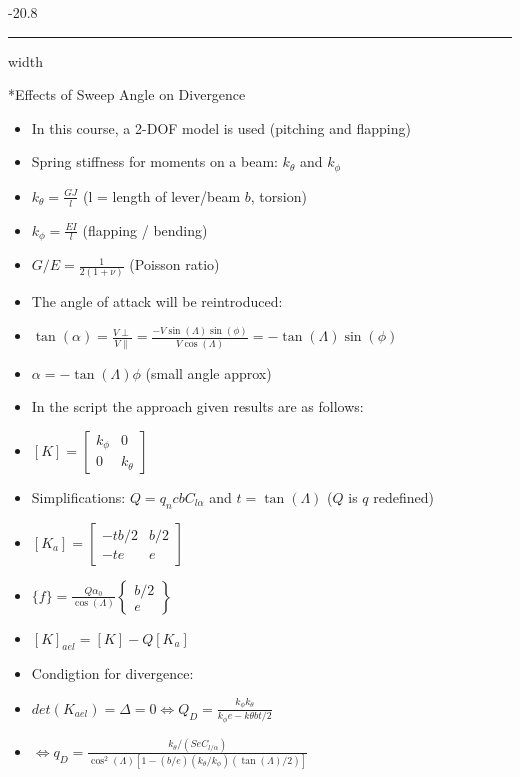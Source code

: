 \documentclass[8pt, landscape, fleqn]{scrartcl}
\makeatletter
\renewcommand{\subsubsection}{\@startsection{subsubsection}{1}{0mm}%
{-2\baselineskip}{0.8\baselineskip}%
{\hrule depth 0.2pt width\columnwidth\vspace*{1.2em}\normalsize\bfseries\rmfamily}}
\makeatother
\begin{document}
\begin{multicols*}{3}
\subsubsection*{Effects of Sweep Angle on Divergence}

\begin{itemize}
    \item In this course, a 2-DOF model is used (pitching and flapping)
    \item Spring stiffness for moments on a beam: $k_\theta$ and $k_\phi$
    \item $k_\theta = \frac{G J}{l}$ (l = length of lever/beam $b$, torsion)
    \item $k_\phi = \frac{E I}{l}$ (flapping / bending)
    \item $G/E = \frac{1}{2(1+\nu)}$ (Poisson ratio)
    \item The angle of attack will be reintroduced:
    \item $\tan(\alpha) = \frac{V\perp}{V\parallel} = \frac{-V \sin(\Lambda) \sin(\phi)}{V \cos(\Lambda)} = -\tan(\Lambda)\sin(\phi)$
    \item $\alpha = -\tan(\Lambda) \phi$ (small angle approx)
    \item In the script the approach given results are as follows:
    \item $[K] = \begin{bmatrix}
        k_\phi & 0 \\ 0 & k_\theta
    \end{bmatrix}$
    \item Simplifications: $Q = q_n c b C_{l\alpha}$ and $t = \tan(\Lambda)$ ($Q$ is $q$ redefined)
    \item $[K_a] = \begin{bmatrix}
        -tb/2 & b/2 \\ -te & e
    \end{bmatrix}$
    \item $\{f\} = \frac{Q \alpha_0}{\cos(\Lambda)} \begin{Bmatrix}
        b/2 \\ e
    \end{Bmatrix}$
    \item $[K]_{ael} = [K]-Q[K_a]$
    \item Condigtion for divergence:
    \item $det (K_{ael}) = \Delta = 0 \Leftrightarrow Q_D = \frac{k_\phi k_\theta}{k_\phi e - k\theta bt /2}$ 
    \item $\Leftrightarrow q_D = \frac{k_\theta / (Se C_{l/\alpha})}{\cos^2(\Lambda) [1-(b/e)(k_\theta/k_\phi)(\tan(\Lambda)/2)]}$

\end{itemize}
\end{multicols*}
\end{document}
